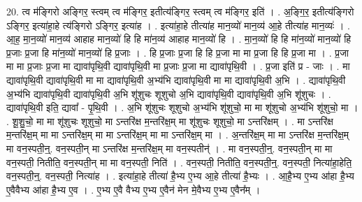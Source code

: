 \documentclass[17pt]{extarticle}
\begin{document}
20. त्व म॑ङ्गिरो अङ्गिर॒ स्त्वम् त्व म॑ङ्गिर॒ इतीत्य॑ङ्गिर॒ स्त्वम् त्व म॑ङ्गिर॒ इति॑ । . अ॒ङ्गि॒र॒ इतीत्य॑ङ्गिरो ऽङ्गिर॒ इत्या॑हा॒हे त्य॑ङ्गिरो ऽङ्गिर॒ इत्या॑ह । . इत्या॑हा॒हे तीत्या॑ह मान॒व्यो॑ मान॒व्य॑ आ॒हे तीत्या॑ह मान॒व्यः॑ । . आ॒ह॒ मा॒न॒व्यो॑ मान॒व्य॑ आहाह मान॒व्यो॑ हि हि मा॑न॒व्य॑ आहाह मान॒व्यो॑ हि । . मा॒न॒व्यो॑ हि हि मा॑न॒व्यो॑ मान॒व्यो॑ हि प्र॒जाः प्र॒जा हि मा॑न॒व्यो॑ मान॒व्यो॑ हि प्र॒जाः । . हि प्र॒जाः प्र॒जा हि हि प्र॒जा मा मा प्र॒जा हि हि प्र॒जा मा । . प्र॒जा मा मा प्र॒जाः प्र॒जा मा द्यावा॑पृथि॒वी द्यावा॑पृथि॒वी मा प्र॒जाः प्र॒जा मा द्यावा॑पृथि॒वी । . प्र॒जा इति॑ प्र - जाः । . मा द्यावा॑पृथि॒वी द्यावा॑पृथि॒वी मा मा द्यावा॑पृथि॒वी अ॒भ्य॑भि द्यावा॑पृथि॒वी मा मा द्यावा॑पृथि॒वी अ॒भि । . द्यावा॑पृथि॒वी अ॒भ्य॑भि द्यावा॑पृथि॒वी द्यावा॑पृथि॒वी अ॒भि शू॑शुचः शूशुचो अ॒भि द्यावा॑पृथि॒वी द्यावा॑पृथि॒वी अ॒भि शू॑शुचः । . द्यावा॑पृथि॒वी इति॒ द्यावा᳚ - पृ॒थि॒वी । . अ॒भि शू॑शुचः शूशुचो अ॒भ्य॑भि शू॑शुचो॒ मा मा शू॑शुचो अ॒भ्य॑भि शू॑शुचो॒ मा । . शू॒शु॒चो॒ मा मा शू॑शुचः शूशुचो॒ मा ऽन्तरि॑क्ष म॒न्तरि॑क्ष॒म् मा शू॑शुचः शूशुचो॒ मा ऽन्तरि॑क्षम् । . मा ऽन्तरि॑क्ष म॒न्तरि॑क्ष॒म् मा मा ऽन्तरि॑क्ष॒म् मा मा ऽन्तरि॑क्ष॒म् मा मा ऽन्तरि॑क्ष॒म् मा । . अ॒न्तरि॑क्ष॒म् मा मा ऽन्तरि॑क्ष म॒न्तरि॑क्ष॒म् मा वन॒स्पती॒न्॒. वन॒स्पती॒न् मा ऽन्तरि॑क्ष म॒न्तरि॑क्ष॒म् मा वन॒स्पतीन्॑ । . मा वन॒स्पती॒न्॒. वन॒स्पती॒न् मा मा वन॒स्पती॒ नितीति॒ वन॒स्पती॒न् मा मा वन॒स्पती॒ निति॑ । . वन॒स्पती॒ नितीति॒ वन॒स्पती॒न्॒. वन॒स्पती॒ नित्या॑हा॒हेति॒ वन॒स्पती॒न्॒. वन॒स्पती॒ नित्या॑ह । . इत्या॑हा॒हे तीत्या॑ है॒भ्य ए॒भ्य आ॒हे तीत्या॑ है॒भ्यः । . आ॒है॒भ्य ए॒भ्य आ॑हा है॒भ्य ए॒वैवैभ्य आ॑हा है॒भ्य ए॒व । . ए॒भ्य ए॒वै वैभ्य ए॒भ्य ए॒वैन॑ मेन मे॒वैभ्य ए॒भ्य ए॒वैन᳚म् । \newline
\end{document}

